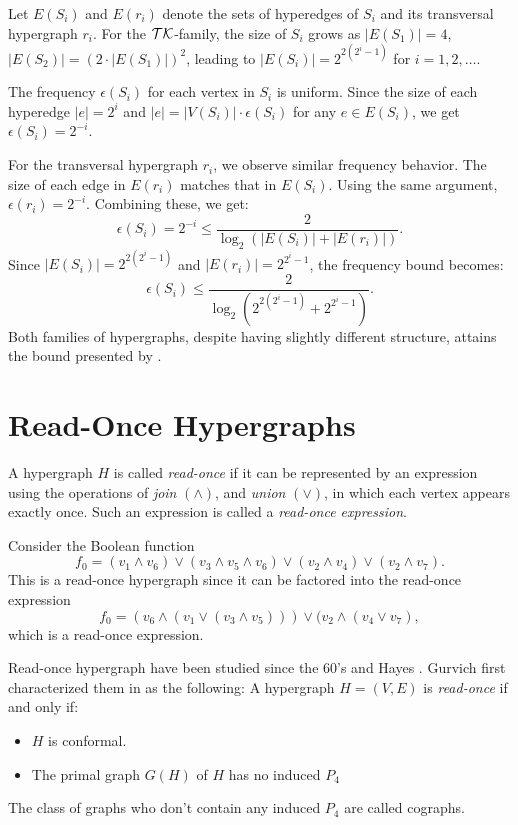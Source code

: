 Let $E(S_i)$ and $E(r_i)$ denote the sets of hyperedges of $S_i$ and its transversal hypergraph $r_i$. For the $\mathcal{TK}$-family, the size of $S_i$ grows as $|E(S_1)|=4$, $|E(S_2)|=(2\cdot|E(S_1)|)^2$, leading to $|E(S_i)|=2^{2(2^i-1)}$ for $i=1,2,\dots$.

The frequency $\epsilon(S_i)$ for each vertex in $S_i$ is uniform. Since the size of each hyperedge $|e|=2^i$ and $|e|=|V(S_i)|\cdot\epsilon(S_i)$ for any $e\in E(S_i)$, we get $\epsilon(S_i)=2^{-i}$.

For the transversal hypergraph $r_i$, we observe similar frequency behavior. The size of each edge in $E(r_i)$ matches that in $E(S_i)$. Using the same argument, $\epsilon(r_i)=2^{-i}$. Combining these, we get:
\[
\epsilon(S_i)=2^{-i}\leq\frac{2}{\log_2(|E(S_i)|+|E(r_i)|)}.
\]
Since $|E(S_i)|=2^{2(2^i-1)}$ and $|E(r_i)|=2^{2^i-1}$, the frequency bound becomes:
\[
\epsilon(S_i)\leq\frac{2}{\log_2(2^{2(2^i-1)}+2^{2^i-1})}.
\]
Both families of hypergraphs, despite having slightly different structure, attains the bound presented by \cite{FK96}.

\section{Read-Once Hypergraphs}\label{sec:read-once}

\begin{definition}
A hypergraph $H$ is called \emph{read-once} if it can be represented by an expression using the operations of \emph{join} $(\wedge)$, and \emph{union} $(\vee)$, in which each vertex appears exactly once. Such an expression is called a \emph{read-once expression}.
\end{definition}

\cite{CH11}

\begin{example}
Consider the Boolean function
\[
f_0=(v_1\wedge v_6)\vee(v_3\wedge v_5\wedge v_6)\vee(v_2\wedge v_4)\vee(v_2\wedge v_7).
\]
This is a read-once hypergraph since it can be factored into the read-once expression
\[
f_0=(v_6\wedge(v_1\vee(v_3\wedge v_5)))\vee(v_2\wedge(v_4\vee v_7),
\]
which is a read-once expression.
\end{example}

Read-once hypergraph have been studied since the 60's \cite{Che67} and Hayes \cite{Hay75}. Gurvich first characterized them in \cite{Gc77} as the following: A hypergraph $H=(V,E)$ is \emph{read-once} if and only if:
\begin{itemize}
\item $H$ is conformal.
\item The primal graph $G(H)$ of $H$ has no induced $P_4$
\end{itemize}
The class of graphs who don't contain any induced $P_4$ are called cographs. \cite{CLB81}

